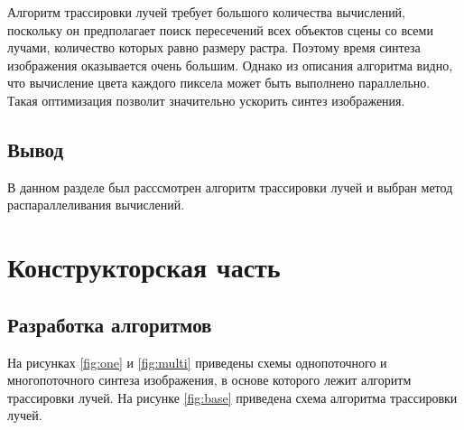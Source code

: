 \documentclass[12pt]{report}
\begin{document}
Алгоритм трассировки лучей требует большого количества вычислений, поскольку он предполагает поиск пересечений всех объектов сцены со всеми лучами, количество которых равно размеру растра. Поэтому время синтеза изображения оказывается очень большим. Однако из описания алгоритма видно, что вычисление цвета каждого пиксела может быть выполнено параллельно. Такая оптимизация позволит значительно ускорить синтез изображения.

\section{Вывод}
	В данном разделе был расссмотрен алгоритм трассировки лучей и выбран метод распараллеливания вычислений.
\clearpage

\chapter{Конструкторская часть}


\section{Разработка алгоритмов}

На рисунках \ref{fig:one} и \ref{fig:multi} приведены схемы однопоточного и многопоточного синтеза изображения, в основе которого лежит алгоритм трассировки лучей. На рисунке  \ref{fig:base} приведена схема алгоритма трассировки лучей.
\end{document}
